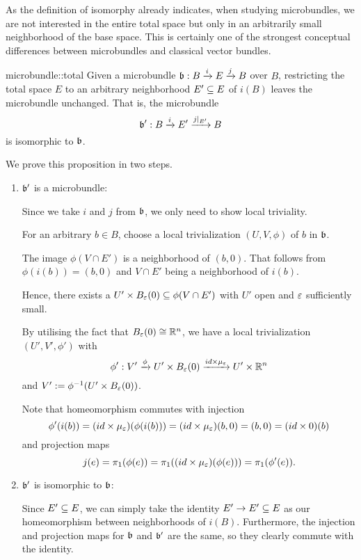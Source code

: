 \begin{myparagraph}
    As the definition of isomorphy already indicates, when studying microbundles,
    we are not interested in the entire total space
    but only in an arbitrarily small neighborhood of the base space.
    This is certainly one of the strongest conceptual differences between microbundles and classical vector bundles.
\end{myparagraph}

\begin{myproposition}{microbundle::total}
    Given a microbundle $\bundledef{\bb}{B}{E}{i}{j}$ over $B$,
    restricting the total space $E$ to an arbitrary neighborhood $E' \sub E$ of $i(B)$ leaves the microbundle unchanged.
    That is, the microbundle
    \[ \bundledef{\bb'}{B}{E'}{i}{j\restr{E'}} \]
    is isomorphic to $\bb$.
\end{myproposition}

\begin{myproof}
    We prove this proposition in two steps.
    \begin{enumerate}
        \item $\bb'$ is a microbundle:
        
        Since we take $i$ and $j$ from $\bb$, we only need to show local triviality.

        For an arbitrary $b \in B$, choose a local trivialization $(U, V, \phi)$ of $b$ in $\bb$.
        
        The image $\phi(V \cap E')$ is a neighborhood of $(b, 0)$.
        That follows from $\phi(i(b)) = (b, 0)$ and $V \cap E'$ being a neighborhood of $i(b)$.

        Hence, there exists a $U' \times \ball[\eps] \sub \phi(V \cap E')$ with $U'$ open and $\eps$ sufficiently small.

        By utilising the fact that $\ball[\eps] \cong \R^n$, we have a local trivialization $(U', V', \phi')$ with
        \[ \phi': V' \xto{\phi} U' \times \ball[\eps] \xto{id \times \mu_\eps} U' \times \R^n \]
        and $V' := \inv{\phi}(U' \times \ball[\eps])$.

        Note that homeomorphism commutes with injection
        \[ \phi'(i(b)) =  (id \times \mu_\eps)(\phi(i(b))) = (id \times \mu_\eps)(b, 0) = (b, 0) = (id \times 0)(b)\]
        and projection maps
        \[ j(e) = \pi_1(\phi(e)) = \pi_1((id \times \mu_\eps)(\phi(e))) = \pi_1(\phi'(e)). \]
        
        \item $\bb'$ is isomorphic to $\bb$:

        Since $E' \sub E$, we can simply take the identity $E' \to E' \sub E$
        as our homeomorphism between neighborhoods of $i(B)$.
        Furthermore, the injection and projection maps for $\bb$ and $\bb'$ are the same,
        so they clearly commute with the identity.
    \end{enumerate}
\end{myproof}